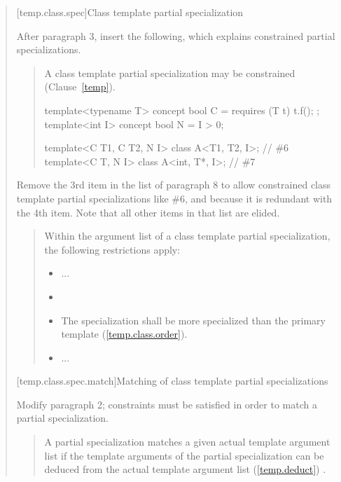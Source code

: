 \begin{quote}
[temp.class.spec]{Class template partial specialization}

After paragraph 3, insert the following, which explains constrained partial 
specializations.

\begin{quote}
\begin{addedblock}
\setcounter{Paras}{3}
\pnum
A class template partial specialization may be constrained
(Clause~\ref{temp}).
\enterexample
\begin{codeblock}
template<typename T> concept bool C = requires (T t) { t.f(); };
template<int I> concept bool N = I > 0;

template<C T1, C T2, N I> class A<T1, T2, I>;  // \#6
template<C T, N I>        class A<int, T*, I>; // \#7
\end{codeblock}
\exitexample
\end{addedblock}
\end{quote}

Remove the 3rd item in the list of paragraph 8 to allow constrained class 
template partial specializations like \#6, and because it is redundant with 
the 4th item. Note that all other items in that list are elided.

\begin{quote}
\setcounter{Paras}{7}
Within the argument list of a class template partial specialization, 
the following restrictions apply:
\begin{itemize}
\item ...

\item {}

\item The specialization shall be more specialized than the primary
template (\ref{temp.class.order}).

\item ...
\end{itemize}
\end{quote}
 
[temp.class.spec.match]{Matching of class template partial specializations}

Modify paragraph 2; constraints must be satisfied in order
to match a partial specialization. 

\begin{quote}
\setcounter{Paras}{1}
\pnum
A partial specialization matches a given actual template argument list if 
the template arguments of the partial specialization can be deduced from the 
actual template argument list (\ref{temp.deduct}) .
\end{quote}


\end{quote}
